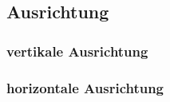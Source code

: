 \subsection{Ausrichtung}

\subsubsection{vertikale Ausrichtung}

\subsubsection{horizontale Ausrichtung}